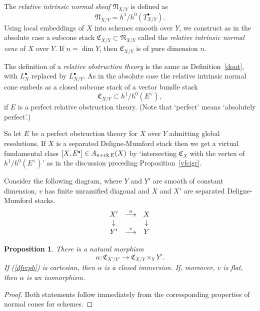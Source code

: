 \documentclass[11pt]{article}
\theoremstyle{plain}
\newtheorem{prop}{Proposition}[section]
\theoremstyle{definition}
\newenvironment{pf}{\begin{proof}}{\end{proof}}
\newcommand{\dual}[1]{{{#1}^{\vee}}}
\newcommand{\com}{^{\scriptscriptstyle\bullet}}
\newcommand{\NN}{{\mathfrak{N}}}
\newcommand{\CC}{{\mathfrak{C}}}
\newcommand{\rk}{\mathop{\rm rk}}
\newcommand{\ldiag}[1]
       {\makebox[0cm]{\({\scriptstyle#1}\downarrow\phantom{\scriptstyle#1}\)}}
\newcommand{\rdiag}[1]
       {\makebox[0cm]{\(\phantom{\scriptstyle#1}\downarrow{\scriptstyle#1}\)}}
\newcommand{\comdia}[9]{
\begin{array}{ccc}
#1 & \stackrel{#2}{\longrightarrow} & #3 \\
\ldiag{#4} & #5 & \rdiag{#6} \\
#7 & \stackrel{#8}{\longrightarrow} & #9
\end{array}}
\theoremstyle{plain}
\theoremstyle{definition}
\theoremstyle{remark}
\begin{document}
The {\em relative intrinsic normal sheaf }\(\NN_{X/Y}\) is defined as
\[
\NN_{X/Y}=h^1/h^0(T_{X/Y}\com).
\]
Using local embeddings of \(X\) into
schemes smooth over \(Y\), we construct as in the absolute case a
subcone stack \(\CC_{X/Y}\subset\NN_{X/Y}\) called the {\em relative
intrinsic normal cone }of \(X\) over \(Y\). If \(n=\dim Y\), then
\(\CC_{X/Y}\) is of pure dimension \(n\).

The definition of a {\em relative obstruction theory }is the same as
Definition~\ref{doot}, with \(L_X\com\) replaced by \(L_{X/Y}\com\). As in
the absolute case the relative intrinsic normal cone embeds as a
closed subcone stack of a vector bundle stack
\[
\CC_{X/Y}\subset h^1/h^0(\dual{E}),
\]
if \(E\) is a perfect relative
obstruction theory. (Note that `perfect' means `absolutely perfect'.)

So let \(E\) be a perfect obstruction theory for \(X\) over \(Y\) admitting
global resolutions.
If \(X\) is a separated Deligne-Mumford stack then we get a virtual
fundamental class \([X,E\com]\in A_{n+\rk E}(X)\) by `intersecting
\(\CC_X\) with the vertex of \(h^1/h^0(\dual{E})\)' as in the discussion
preceding Proposition~\ref{vfcigr}.

Consider the following diagram, where \(Y\) and \(Y'\) are smooth of
constant dimension, \(v\) has finite unramified diagonal and \(X\) and
\(X'\) are separated Deligne-Mumford stacks.
\begin{equation}\label{dfrcpb}
\comdia{X'}{u}{X}{}{}{}{Y'}{v}{Y}
\end{equation}

\begin{prop} \label{ncfprc}
There is a natural morphism
\[
\alpha:\CC_{X'/Y'}\longrightarrow\CC_{X/Y}\times_YY'.
\]
If
(\ref{dfrcpb}) is cartesian, then \(\alpha\) is a closed immersion. If,
moreover, \(v\) is flat, then
\(\alpha\) is an isomorphism.
\end{prop}
\begin{pf}
Both statements follow immediately from the corresponding
properties of normal cones for schemes.
\end{pf}
\end{document}
